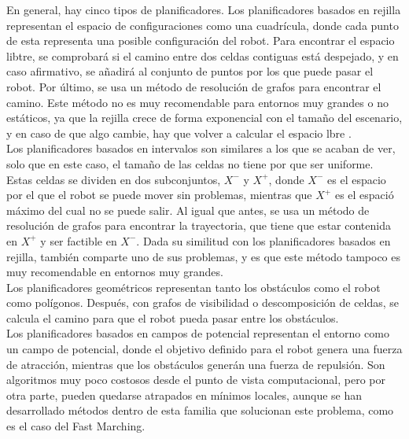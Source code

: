 En general, hay cinco tipos de planificadores. Los planificadores basados en rejilla representan el espacio de configuraciones como una cuadrícula, donde cada punto de esta representa una posible configuración del robot. Para encontrar el espacio libtre, se comprobará si el camino entre dos celdas contiguas está despejado, y en caso afirmativo, se añadirá al conjunto de puntos por los que puede pasar el robot. Por último, se usa un método de resolución de grafos para encontrar el camino. Este método no es muy recomendable para entornos muy grandes o no estáticos, ya que la rejilla crece de forma exponencial con el tamaño del escenario, y en caso de que algo cambie, hay que volver a calcular el espacio lbre .\\

Los planificadores basados en intervalos son similares a los que se acaban de ver, solo que en este caso, el tamaño de las celdas no tiene por que ser uniforme. Estas celdas se dividen en dos subconjuntos, $X^-$ y $X^+$, donde $X^-$ es el espacio por el que el robot se puede mover sin problemas, mientras que $X^+$ es el espació máximo del cual no se puede salir. Al igual que antes, se usa un método de resolución de grafos para encontrar la trayectoria, que tiene que estar contenida en $X^+$ y ser factible en $X^-$. Dada su similitud con los planificadores basados en rejilla, también comparte uno de sus problemas, y es que este método tampoco es muy recomendable en entornos muy grandes.\\

Los planificadores geométricos representan tanto los obstáculos como el robot como polígonos. Después, con grafos de visibilidad o descomposición de celdas, se calcula el camino para que el robot pueda pasar entre los obstáculos.\\

Los planificadores basados en campos de potencial representan el entorno como un campo de potencial, donde el objetivo definido para el robot genera una fuerza de atracción, mientras que los obstáculos generán una fuerza de repulsión. Son algoritmos muy poco costosos desde el punto de vista computacional, pero por otra parte, pueden quedarse atrapados en mínimos locales, aunque se han desarrollado métodos dentro de esta familia que solucionan este problema, como es el caso del Fast Marching.\\

